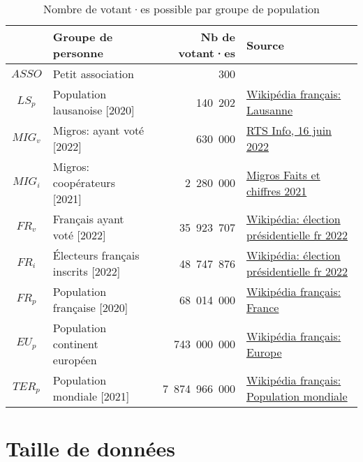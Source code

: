 \documentclass[../report]{subfiles}
\begin{document}
\begin{table}[H]
  \begin{center}
    \begin{tabular}{|c|l|r|l|}
      \hline
       & Groupe de personne                          & Nb de votant·es & Source \\
      \hline
      \hline
      $ASSO$ & Petit association                  & 300 & \\
      $LS_p$ & Population lausanoise [2020]       &         140~202 & \href{https://fr.wikipedia.org/wiki/Lausanne}{Wikipédia français: Lausanne}\\
      $MIG_v$ & Migros: ayant voté [2022]         &         630~000 & \href{https://www.rts.ch/info/suisse/13176954-la-vente-dalcool-reste-interdite-a-la-migros-apres-un-non-massif-en-votation.html}{RTS Info, 16 juin 2022}\\
      $MIG_i$ & Migros: coopérateurs [2021]       &       2~280~000 & \href{https://corporate.migros.ch/dam/jcr:d5b1ae79-a8e8-4b98-9f2d-4b4974d39486/faits-et-chiffres-2021.pdf}{Migros Faits et chiffres 2021}\\
      $FR_v$ & Français ayant voté [2022]         &      35~923~707 & \href{https://fr.wikipedia.org/wiki/Élection_présidentielle_française_de_2022}{Wikipédia: élection présidentielle fr 2022}\\
      $FR_i$ & Électeurs français inscrits [2022] &      48~747~876 & \href{https://fr.wikipedia.org/wiki/Élection_présidentielle_française_de_2022}{Wikipédia: élection présidentielle fr 2022}\\
      $FR_p$ & Population française [2020]        &      68~014~000 & \href{https://fr.wikipedia.org/wiki/France}{Wikipédia français: France}\\       
      $EU_p$ & Population continent européen      &     743~000~000 & \href{https://fr.wikipedia.org/wiki/Europe}{Wikipédia français: Europe}\\       
      $TER_p$ & Population mondiale [2021]        &   7~874~966~000 & \href{https://fr.wikipedia.org/wiki/Population_mondiale}{Wikipédia français: Population mondiale}\\       
      \hline
    \end{tabular}
  \end{center}
  \caption{Nombre de votant·es possible par groupe de population}\label{tab:}
\end{table}

\section{Taille de données} \label{sec:res:data-size}
\end{document}
